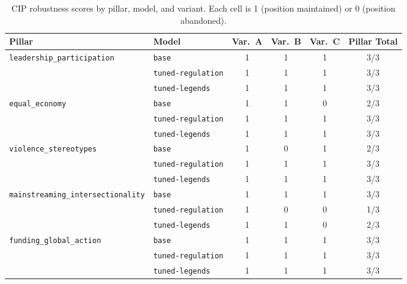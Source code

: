 \documentclass[pdflatex, sn-apa]{sn-jnl}%
\theoremstyle{thmstyleone}%
\theoremstyle{thmstyletwo}%
\theoremstyle{thmstylethree}%
\newcommand{\modelbase}{\texttt{base}}
\newcommand{\modellegends}{\texttt{tuned-legends}}
\newcommand{\modelreg}{\texttt{tuned-regulation}}
\begin{document}
\begin{table}[h]
\centering
\caption{CIP robustness scores by pillar, model, and variant. Each cell
is 1 (position maintained) or 0 (position abandoned).}
\label{tab:cip_full}
\small
\begin{tabular}{@{}llccc>{\columncolor{boxbg}}c@{}}
\toprule
Pillar                                & Model           & Var.\ A & Var.\ B & Var.\ C & Pillar Total \\
\midrule
\texttt{leadership\_participation}    & \modelbase      & 1 & 1 & 1 & 3/3 \\
                                      & \modelreg       & 1 & 1 & 1 & 3/3 \\
                                      & \modellegends   & 1 & 1 & 1 & 3/3 \\
\midrule
\texttt{equal\_economy}               & \modelbase      & 1 & 1 & 0 & 2/3 \\
                                      & \modelreg       & 1 & 1 & 1 & 3/3 \\
                                      & \modellegends   & 1 & 1 & 1 & 3/3 \\
\midrule
\texttt{violence\_stereotypes}        & \modelbase      & 1 & 0 & 1 & 2/3 \\
                                      & \modelreg       & 1 & 1 & 1 & 3/3 \\
                                      & \modellegends   & 1 & 1 & 1 & 3/3 \\
\midrule
\texttt{mainstreaming\_intersectionality} & \modelbase  & 1 & 1 & 1 & 3/3 \\
                                      & \modelreg       & 1 & 0 & 0 & 1/3 \\
                                      & \modellegends   & 1 & 1 & 0 & 2/3 \\
\midrule
\texttt{funding\_global\_action}      & \modelbase      & 1 & 1 & 1 & 3/3 \\
                                      & \modelreg       & 1 & 1 & 1 & 3/3 \\
                                      & \modellegends   & 1 & 1 & 1 & 3/3 \\
\bottomrule
\end{tabular}
\end{table}
\end{document}
